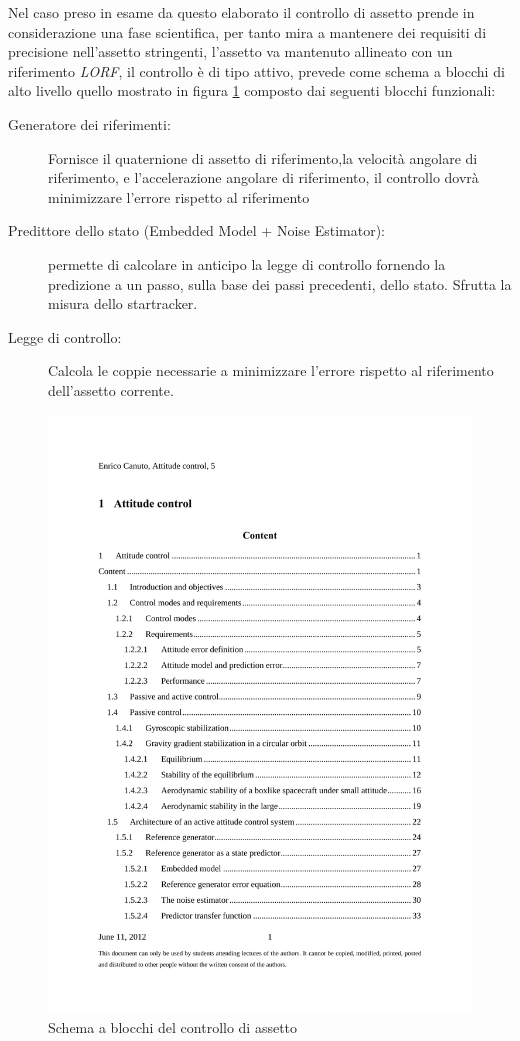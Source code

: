 Nel caso preso in esame da questo elaborato il controllo di assetto prende in
considerazione una fase scientifica, per tanto mira a mantenere dei requisiti di
precisione nell'assetto stringenti, l'assetto va mantenuto allineato con un
riferimento \emph{LORF}, il controllo è di tipo attivo, prevede come schema a
blocchi di alto livello quello mostrato in figura \ref{fig:attitude_control}
composto dai seguenti blocchi funzionali:
\begin{description}
\item[Generatore dei riferimenti:] Fornisce il quaternione di assetto di
riferimento,la velocità angolare di riferimento, e l'accelerazione angolare di
riferimento, il controllo dovrà minimizzare l'errore rispetto al riferimento
\item[Predittore dello stato (Embedded Model + Noise Estimator):] permette di
calcolare in anticipo la legge di controllo fornendo la predizione a un passo,
sulla base dei passi precedenti, dello stato. Sfrutta la misura dello startracker.
\item[Legge di controllo:] Calcola le coppie necessarie a minimizzare l'errore
rispetto al riferimento dell'assetto corrente.
\end{description}

 \begin{figure}[ht!]
\includegraphics[width=\textwidth,page=24,clip=true,trim=2.8cm 17cm 2.7cm 3.5cm]{control/attitude_control/images/attitude_control.pdf}
\caption{Schema a blocchi del controllo di assetto}
\label{fig:attitude_control}
\end{figure}